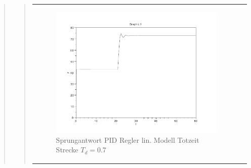 \begin{quote}
\begin{quote}
            \begin{center}
                \begin{tabular}{ll}
                
                \hspace{-1cm}
                    \begin{minipage}{0.6\textwidth}
                        \begin{figure}[H]
                            \includegraphics[scale=0.4, trim = 0cm 0cm 0cm
                            0cm, clip]
                            {./Bilder/4_5_Td_04_K_tilde}
                              \caption{Sprungantwort PID Regler lin. Modell Totzeit Strecke $T_d = 0.7$}
                        \end{figure}
                    \end{minipage}
                    

\end{tabular}
\end{center}
\end{quote}
\end{quote}
